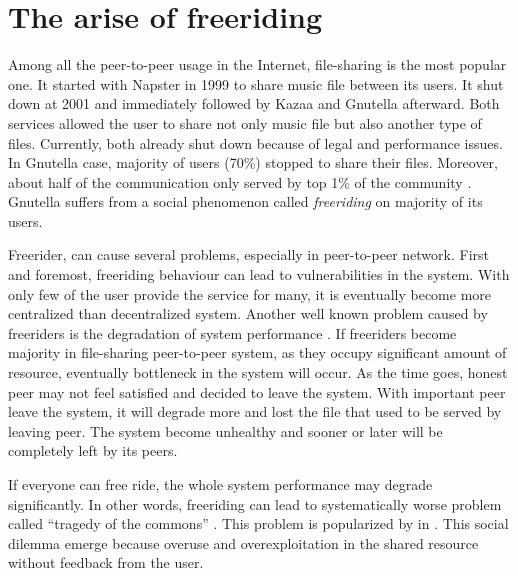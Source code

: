 \section{The arise of freeriding}
Among all the peer-to-peer usage in the Internet, file-sharing is the most popular one. It started with Napster in 1999 to share music file between its users. It shut down at 2001 and immediately followed by Kazaa and Gnutella afterward. Both services allowed the user to share not only music file but also another type of files. Currently, both already shut down because of legal and performance issues. In Gnutella case, majority of users (70\%) stopped to share their files. Moreover, about half of the communication only served by top 1\% of the community \cite{2000:freeridegnutella:adar}. Gnutella suffers from a social phenomenon called \textit{freeriding} on majority of its users.

Freerider, can cause several problems, especially in peer-to-peer network. First and foremost, freeriding behaviour can lead to vulnerabilities in the system. With only few of the user provide the service for many, it is eventually become more centralized than decentralized system. Another well known problem caused by freeriders is the degradation of system performance \cite{2000:freeridegnutella:adar}. If freeriders become majority in file-sharing peer-to-peer system, as they occupy significant amount of resource, eventually bottleneck in the system will occur. As the time goes, honest peer may not feel satisfied and decided to leave the system. With important peer leave the system, it will degrade more and lost the file that used to be served by leaving peer. The system become unhealthy and sooner or later will be completely left by its peers.

If everyone can free ride, the whole system performance may degrade significantly. In other words, freeriding can lead to systematically worse problem called ``tragedy of the commons'' \cite{1968:tragedycommon:hardin}. This problem is popularized by \citet*{1968:tragedycommon:hardin} in \citeyear{1968:tragedycommon:hardin}. This social dilemma emerge because overuse and overexploitation in the shared resource without feedback from the user. 

